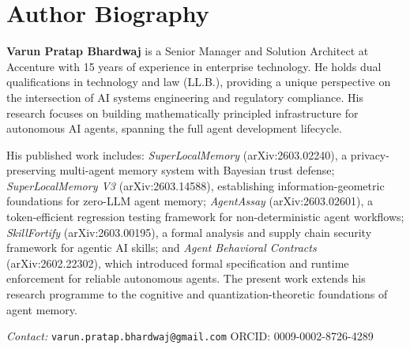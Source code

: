 \section*{Author Biography}

\textbf{Varun Pratap Bhardwaj} is a Senior Manager and Solution Architect at Accenture with 15 years of experience in enterprise technology. He holds dual qualifications in technology and law (LL.B.), providing a unique perspective on the intersection of AI systems engineering and regulatory compliance. His research focuses on building mathematically principled infrastructure for autonomous AI agents, spanning the full agent development lifecycle.

His published work includes: \emph{SuperLocalMemory} (arXiv:2603.02240), a privacy-preserving multi-agent memory system with Bayesian trust defense; \emph{SuperLocalMemory V3} (arXiv:2603.14588), establishing information-geometric foundations for zero-LLM agent memory; \emph{AgentAssay} (arXiv:2603.02601), a token-efficient regression testing framework for non-deterministic agent workflows; \emph{SkillFortify} (arXiv:2603.00195), a formal analysis and supply chain security framework for agentic AI skills; and \emph{Agent Behavioral Contracts} (arXiv:2602.22302), which introduced formal specification and runtime enforcement for reliable autonomous agents. The present work extends his research programme to the cognitive and quantization-theoretic foundations of agent memory.

\noindent\textit{Contact:} \texttt{varun.pratap.bhardwaj@gmail.com} \quad ORCID: 0009-0002-8726-4289

